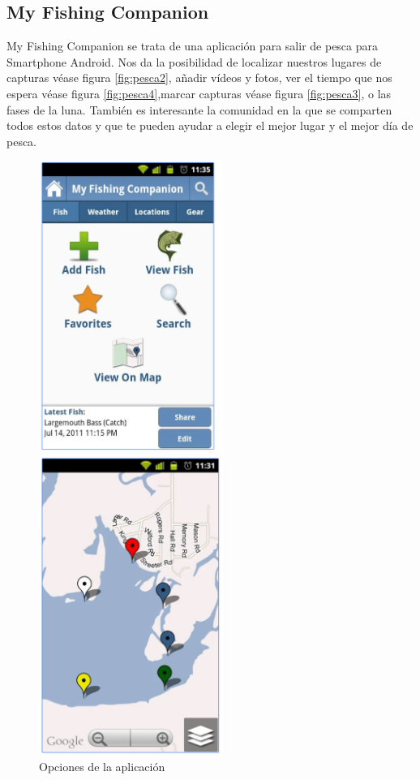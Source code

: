\subsection{My Fishing Companion}
 My Fishing Companion se trata de una aplicación para salir de pesca para Smartphone Android. Nos da la posibilidad de localizar nuestros lugares de capturas  véase figura \ref{fig:pesca2}, añadir vídeos y fotos, ver el tiempo que nos espera véase figura \ref{fig:pesca4},marcar capturas  véase figura \ref{fig:pesca3}, o las fases de la luna. También es interesante la comunidad en la que se comparten todos estos datos y que te pueden ayudar a elegir el mejor lugar y el mejor día de pesca.
 
 \begin{figure}[htbp]
\begin{minipage}[b]{0.5\linewidth} %
\centering
\includegraphics[width=6cm]{pesca1.png}
\caption{ Opciones de la aplicación}
\label{fig:pesca1}
\end{minipage}
\hspace{0.5cm} %
\begin{minipage}[b]{0.5\linewidth}
\centering
\includegraphics[width=6cm]{pesca2.png}


\end{minipage}
\end{figure}
